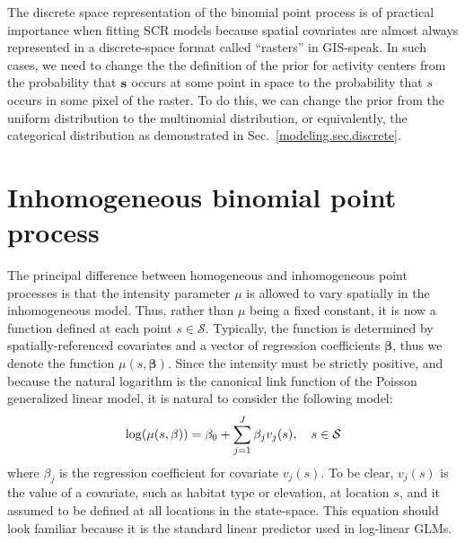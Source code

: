 The discrete space representation of the binomial point process is of
practical importance when fitting SCR models because spatial covariates
are almost always represented in a discrete-space format called
``rasters'' in GIS-speak. In such cases, we need to change the
the definition of the prior for activity centers from the probability
that $\bf s$ occurs at some point in space to the probability that $s$
occurs in some pixel of the raster. To do this, we can change the
prior from the uniform distribution to the
multinomial distribution, or equivalently, the categorical
distribution as demonstrated in Sec.~\ref{modeling.sec.discrete}.



\section{Inhomogeneous binomial point process}

The principal difference between homogeneous and inhomogeneous point
processes is that the intensity parameter $\mu$ is allowed to vary spatially
in the inhomogeneous model. Thus, rather than $\mu$ being a fixed constant,
it is now a function defined at each point $s \in
\mathcal{S}$. Typically, the function is determined by
spatially-referenced covariates and a vector of regression
coefficients $\bm \beta$, thus we denote the function $\mu(s,
\bm{\beta})$. Since the intensity must be strictly
positive, and because the natural logarithm is the canonical link
function of the Poisson generalized linear model, it is natural to
consider the following model:
\begin{equation}
  \log(\mu(s, \beta)) = \beta_0 + \sum_{j=1}^J \beta_j v_j(s), \quad  s \in \cal{S}
  \label{state-space.eq.loglin}
\end{equation}
where $\beta_j$ is the regression coefficient for covariate
$v_j(s)$. To be clear, $v_j(s)$ is the value of a covariate, such as
habitat type or elevation, at location $s$, and it assumed to be
defined at all locations in the state-space.
This equation should look
familiar because it is the standard linear predictor used in log-linear
GLMs.

